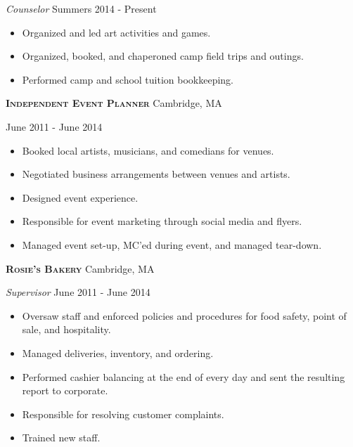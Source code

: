 \documentclass[a4paper]{article}
\begin{document}
\begin{addmargin}[1em]{0em}

\textit{Counselor} \hfill Summers 2014 - Present\\
\vspace{-1mm}
\begin{itemize} \itemsep 1pt
    \item Organized and led art activities and games.
    \item Organized, booked, and chaperoned camp field trips and outings.
    \item Performed camp and school tuition bookkeeping.
\end{itemize}
\end{addmargin}


\textbf{\textsc{Independent Event Planner}} \hfill Cambridge, MA\\
\vspace{2mm}
\begin{addmargin}[1em]{0em}
\textit{} \hfill June 2011 - June 2014\\
\vspace{-1mm}
\begin{itemize} \itemsep 1pt
    \item Booked local artists, musicians, and comedians for venues.
    \item Negotiated business arrangements between venues and artists.
    \item Designed event experience.
    \item Responsible for event marketing through social media and flyers.
    \item Managed event set-up, MC'ed during event, and managed tear-down.
\end{itemize}
\end{addmargin}

\textbf{\textsc{Rosie’s Bakery}} \hfill Cambridge, MA\\
\vspace{2mm}
\begin{addmargin}[1em]{0em}
\textit{Supervisor} \hfill June 2011 - June 2014\\
\vspace{-1mm}
\begin{itemize} \itemsep 1pt
    \item Oversaw staff and enforced policies and procedures for food safety, 
        point of sale, and hospitality.
    \item Managed deliveries, inventory, and ordering.
    \item Performed cashier balancing at the end of every day and sent the resulting
        report to corporate.  
    \item Responsible for resolving customer complaints.
    \item Trained new staff.
\end{itemize}
\end{addmargin}
\end{document}
